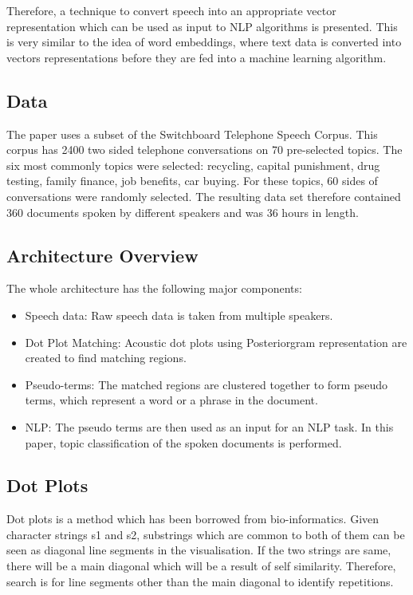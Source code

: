 \documentclass[a4paper]{article}
\begin{document}
Therefore, a technique to convert speech into an appropriate vector representation which can be used as input to NLP algorithms is presented. This is very similar to the idea of word embeddings, where text data is converted into vectors representations before they are fed into a machine learning algorithm.

\subsection{Data}
The paper uses a subset of the Switchboard Telephone Speech Corpus. This corpus has 2400 two sided telephone conversations on 70 pre-selected topics. The six most commonly topics were selected: recycling, capital punishment, drug testing, family finance, job benefits, car buying. For these topics, 60 sides of conversations were randomly selected. The resulting data set therefore contained 360 documents spoken by different speakers and was 36 hours in length.


\subsection{Architecture Overview}
The whole architecture has the following major components:

\begin{itemize}
\item Speech data: Raw speech data is taken from multiple speakers.
\item Dot Plot Matching: Acoustic dot plots using Posteriorgram representation are created to find matching regions.
\item Pseudo-terms: The matched regions are clustered together to form pseudo terms, which represent a word or a phrase in the document.
\item NLP: The pseudo terms are then used as an input for an NLP task. In this paper, topic classification of the spoken documents is performed.
\end{itemize}

\subsection{Dot Plots}
Dot plots is a method which has been borrowed from bio-informatics. Given character strings s1 and s2, substrings which are common to both of them can be seen as diagonal line segments in the visualisation. If the two strings are same, there will be a main diagonal which will be a result of self similarity. Therefore, search is for line segments other than the main diagonal to identify repetitions.
\end{document}

